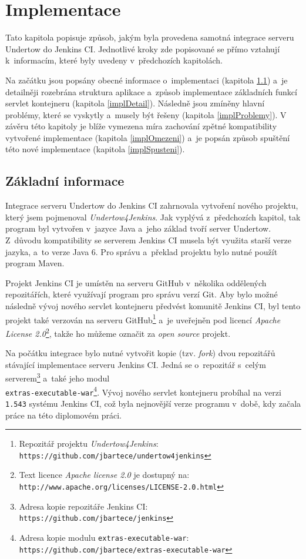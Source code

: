 \chapter{Implementace}  \label{kapImpl}
    Tato kapitola popisuje způsob, jakým byla provedena samotná integrace serveru Undertow do Jenkins CI.
    Jednotlivé kroky zde popisované se přímo vztahují k~informacím, které byly uvedeny v~předchozích kapitolách.
    
    Na začátku jsou popsány obecné informace o~implementaci (kapitola \ref{implZaklad})
    a~je detailněji rozebrána struktura aplikace a~způsob implementace
    základních funkcí servlet kontejneru (kapitola \ref{implDetail}). 
    Následně jsou zmíněny hlavní problémy, které se vyskytly a~musely
    být řešeny (kapitola \ref{implProblemy}).
    V závěru této kapitoly je blíže vymezena míra zachování zpětné kompatibility
    vytvořené implementace (kapitola \ref{implOmezeni}) a~je popsán způsob
    spuštění této nové implementace (kapitola \ref{implSpusteni}).


    

    
    \section{Základní informace} \label{implZaklad}
        Integrace serveru Undertow do Jenkins CI zahrnovala vytvoření nového projektu, který 
        jsem pojmenoval \emph{Undertow4Jenkins}. 
        Jak vyplývá z~předchozích kapitol, tak program byl vytvořen v~jazyce Java a~jeho základ 
        tvoří server Undertow. 
        Z~důvodu kompatibility se serverem Jenkins CI musela být využita starší verze jazyka, a~to verze Java 6.
        Pro správu a~překlad projektu bylo nutné použít program Maven. 
        
        Projekt Jenkins CI je umístěn na serveru GitHub v~několika oddělených repozitářích, které
        využívají program pro správu verzí Git. Aby bylo možné následně vývoj
        nového servlet kontejneru předvést komunitě Jenkins CI, 
        byl tento projekt také verzován na serveru 
        GitHub\footnote{Repozitář projektu \emph{Undertow4Jenkins}: \texttt{https://github.com/jbartece/undertow4jenkins}} 
        a~je uveřejněn pod licencí \emph{Apache License 2.0}\footnote{Text licence \emph{Apache license 2.0} je dostupný na: 
        \texttt{http://www.apache.org/licenses/LICENSE-2.0.html}}, takže ho můžeme označit za \emph{open source} projekt.

        Na počátku integrace bylo nutné vytvořit kopie (tzv. \emph{fork}) dvou repozitářů stávající implementace serveru Jenkins CI.
        Jedná se o~repozitář s~celým serverem\footnote{Adresa kopie repozitáře Jenkins CI: 
        \texttt{https://github.com/jbartece/jenkins}} a~také jeho modul 
        \\\texttt{extras-executable-war}\footnote{Adresa kopie modulu \texttt{extras-executable-war}:
        \texttt{https://github.com/jbartece/extras-executable-war} }.
        Vývoj nového servlet kontejneru probíhal na verzi \texttt{1.543} systému Jenkins CI, což byla nejnovější verze
        programu v~době, kdy začala práce na této diplomovém práci. 
        
